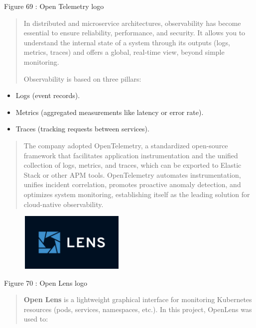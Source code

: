 \documentclass[12pt,a4paper]{report}
\begin{document}
\protect\hypertarget{_Toc201954545}{}{}Figure 69 : Open Telemetry logo

\begin{quote}
In distributed and microservice architectures, observability has become
essential to ensure reliability, performance, and security. It allows
you to understand the internal state of a system through its outputs
(logs, metrics, traces) and offers a global, real-time view, beyond
simple monitoring.

Observability is based on three pillars:
\end{quote}

\begin{itemize}
\item
  Logs (event records).
\item
  Metrics (aggregated measurements like latency or error rate).
\item
  Traces (tracking requests between services).
\end{itemize}

\begin{quote}
The company adopted OpenTelemetry, a standardized open-source framework
that facilitates application instrumentation and the unified collection
of logs, metrics, and traces, which can be exported to Elastic Stack or
other APM tools. OpenTelemetry automates instrumentation, unifies
incident correlation, promotes proactive anomaly detection, and
optimizes system monitoring, establishing itself as the leading solution
for cloud-native observability.
\end{quote}

\includegraphics[width=2.8405in,height=1.10236in]{vertopal_d1b0b2209edd4c6aa8254f57daa0953b/media/image89.png}

\protect\hypertarget{_Toc201954546}{}{}Figure 70 : Open Lens logo

\begin{quote}
\textbf{Open Lens} is a lightweight graphical interface for monitoring
Kubernetes resources (pods, services, namespaces, etc.). In this
project, OpenLens was used to:
\end{quote}
\end{document}
